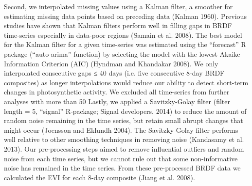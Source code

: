 {Second, we interpolated missing values using a Kalman filter, a smoother for estimating missing data points based on preceding data (Kalman 1960). Previous studies have shown that Kalman filters perform well in filling gaps in BRDF time-series especially in data-poor regions (Samain et al. 2008). The best model for the Kalman filter for a given time-series was estimated using the “forecast” R package (“auto-arima” function) by selecting the model with the lowest Akaike Information Criterion (AIC) (Hyndman and Khandakar 2008). We only interpolated consecutive gaps ≤ 40 days (i.e. five consecutive 8-day BRDF composites) as longer interpolations would reduce our ability to detect short-term changes in photosynthetic activity.  We excluded all time-series from further analyses with more than 50 %
Lastly, we applied a Savitzky-Golay filter (filter length = 5, “signal” R-package; Signal developers, 2014) to reduce the amount of random noise remaining in the time series, but retain small abrupt changes that might occur (Joensson and Eklundh 2004). The Savitzky-Golay filter performs well relative to other smoothing techniques in removing noise (Kandasamy et al. 2013). Our pre-processing steps aimed to remove influential outliers and random noise from each time series, but we cannot rule out that some non-informative noise has remained in the time series. From these pre-processed BRDF data we calculated the EVI for each 8-day composite (Jiang et al. 2008).

}
